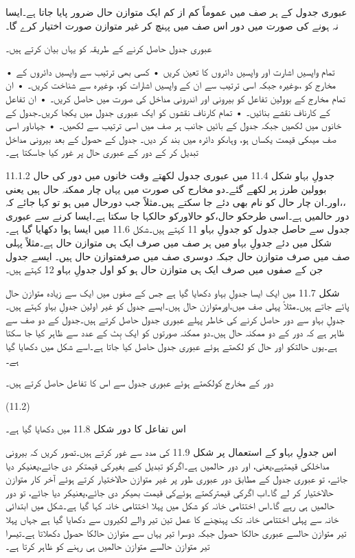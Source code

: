 عبوری جدول کے ہر صف میں عموماً کم از کم ایک متوازن حال ضرور پایا جاتا ہے۔ایسا نہ ہونے کی صورت میں دور اس صف میں پہنچ کر غیر متوازن صورت اختیار کرے گا۔

عبوری جدول حاصل کرنے کے طریقہ کو یہاں بیان کرتے ہیں۔

    • تمام واپسیں اشارت اور واپسیں دائروں کا تعین کریں
    • کسی بھی ترتیب سے واپسیں دائروں کے مخارج کو ،،وغیرہ جبکہ اسی ترتیب سے ان کے واپسیں اشارات کو، ،وغیرہ سے شناخت کریں۔
    • ان تمام مخارج کے بوولین تفاعل کو بیرونی اور اندرونی مداخل کی صورت میں حاصل کریں۔
    • ان تفاعل کے کارناف نقشے بنائیں۔
    • تمام کارناف نقشوں کو ایک عبوری جدول میں یکجا کریں۔جدول کے خانوں میں  لکھیں جبکہ جدول کے بائیں جانب ہر صف میں اسی ترتیب سے لکھیں۔
    • جہاںاور اسی صف میںکی قیمت یکساں ہو، وہاںکو دائرہ میں بند کر دیں۔
جدول کے حصول کے بعد بیرونی مداخل تبدیل کر کے دور کے عبوری حال  پر غور کیا جاسکتا ہے۔ 

11.1.2 جدولِ بہاو
	شکل 11.4 میں عبوری جدول لکھتے وقت خانوں میں دور کی حال بوولین طرز پر لکھے گئے۔دو مخارج کی صورت میں یہاں چار ممکنہ حال ہیں یعنی ،،اور۔ان چار حال  کو نام بھی دئے جا سکتے ہیں۔مثلاً جب دورحال میں ہو تو کہا جائے کہ دور حالمیں ہے۔اسی طرحکو حال،کو حالاورکو حالکہا جا سکتا ہے۔ایسا کرنے سے عبوری جدول سے حاصل جدول کو جدولِ بہاو 11 کہتے ہیں۔شکل 11.6 میں ایسا ہوا دکھایا گیا ہے۔
	شکل میں دئے جدولِ بہاو میں ہر صف میں صرف ایک ہی متوازن حال ہے۔مثلاً پہلی صف میں صرف متوازن حال جبکہ دوسری صف میں صرفمتوازن حال ہیں۔ ایسے جدول جن کے صفوں میں صرف ایک ہی متوازن حال ہو کو اول جدولِ بہاو 12 کہتے ہیں۔

	شکل 11.7 میں ایک ایسا جدولِ بہاو دکھایا گیا ہے جس کے صفوں میں ایک سے زیادہ متوازن حال پائے جاتے ہیں۔مثلاً پہلی صف میں،اورمتوازن حال ہیں۔ایسے جدول کو غیر اولین جدولِ بہاو کہتے ہیں۔
	 جدولِ بہاو سے دور حاصل کرنے کی خاطر پہلے عبوری جدول حاصل کرتے ہیں۔جدول کے دو صف سے ظاہر ہے کہ دور کے دو ممکنہ حال ہیں۔دو ممکنہ صورتوں کو ایک بِٹ کے عدد سے ظاہر کیا جا سکتا ہے۔یوں حالتکو اور حال کو لکھتے ہوئے عبوری جدول حاصل کیا جاتا ہے۔اسے شکل میں دکھایا گیا ہے۔

	دور کے مخارج کولکھتے ہوئے عبوری جدول سے اس کا تفاعل حاصل کرتے ہیں۔

 
(11.2)

اس تفاعل کا دور شکل 11.8 میں دکھایا گیا ہے۔


	 اس جدولِ بہاو کے استعمال پر شکل 11.9 کی مدد سے غور کرتے ہیں۔تصور کریں کہ بیرونی مداخلکی قیمتہے،یعنی،  اور دور حالمیں ہے۔اگرکو تبدیل کیے بغیرکی قیمتکر دی جائے،یعنیکر دیا جائے، تو عبوری جدول کے مطابق دور  عبوری طور پر غیر متوازن حالاختیار کرتے ہوئے آخر کار متوازن حالاختیار کر لے  گا۔اب اگرکی قیمترکھتے ہوئےکی قیمت بھیکر دی جائے،یعنیکر دیا جائے، تو دور حالمیں ہی رہے گا۔اس اختتامی خانہ کو شکل میں پہلا اختتامی خانہ کہا گیا ہے۔شکل میں ابتدائی خانہ سے پہلی اختتامی خانہ تک پہنچنے کا عمل تین تیر والے لکیروں سے دکھایا گیا ہے جہاں پہلا تیر  متوازن حالسے عبوری حالکا حصول جبکہ دوسرا تیر یہاں سے متوازن حالکا حصول دکھلاتا ہے۔تیسرا تیر متوازن حالسے متوازن حالمیں ہی رہنے کو ظاہر کرتا ہے۔


